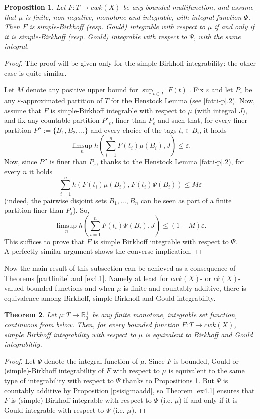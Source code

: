\documentclass[11pt,a4paper,twoside]{amsart}
\newtheorem{theorem}{Theorem}[section]
\newtheorem{proposition}[theorem]{Proposition}
\begin{document}
\begin{proposition}\label{mupsiwb}
Let $F:T\to cwk(X)$ be any bounded multifunction, and assume
 that $\mu$ is finite, non-negative, monotone and integrable, with integral function $\Psi$. Then $F$ is simple-Birkhoff (resp. Gould) integrable with respect to $\mu$ if and only if it is simple-Birkhoff (resp. Gould) integrable  with respect to $\Psi$, with the same integral.
\end{proposition}
\begin{proof}
The proof will be given only for the simple Birkhoff integrability: the other case is quite similar.

Let $M$ denote any positive upper bound for $\sup_{t\in T}|F(t)|$. Fix ${\varepsilon}$ and let $P_{\varepsilon}$ be any ${\varepsilon}$-approximated partition of $T$ for the Henstock Lemma (see \ref{fatti-p}.2). Now, assume that $F$ is simple-Birkhoff integrable with respect to $\mu$ (with integral $J$), and fix any countable partition $P'_{\varepsilon}$, finer than $P_{\varepsilon}$ and such that, for every finer partition $P'':=\{B_1,B_2,...\}$ and every choice of the tags $t_i\in B_i$, it holds
$$\limsup_nh(\sum_{i=1}^nF(t_i)\mu(B_i),J)\leq {\varepsilon}.$$ 
Now, since $P''$ is finer than $P_{\varepsilon}$, thanks to the Henstock Lemma \ref{fatti-p}.2), for every $n$ it holds
$$\sum_{i=1}^nh(F(t_i)\mu(B_i),F(t_i)\Psi(B_i))\leq M {\varepsilon}$$
(indeed, the pairwise disjoint sets $B_1,...,B_n$ can be seen as part of a finite partition finer than $P_{\varepsilon}$).
So, 
$$\limsup_nh(\sum_{i=1}^n F(t_i)\Psi(B_i),J)\leq (1+M){\varepsilon}.$$
This suffices to prove that $F$ is simple Birkhoff integrable with respect to $\Psi$.
\\
A perfectly similar argument shows the converse implication.
\end{proof}

Now the main result of this subsection can be achieved as a 
 consequence of Theorems \ref{partfinite} and \ref{ex4.1}. Namely
at least for $cwk(X)$- or $ck(X)$-valued bounded functions and when $\mu$ is finite and countably additive, there is equivalence among Birkhoff, simple Birkhoff and Gould integrability.\\

\begin{theorem}\label{general}
Let $\mu:T\to {\mathbb{R}}^+_0$ be any finite monotone, integrable set function, continuous from below. Then, for every bounded function $F:T\to cwk(X)$, simple Birkhoff integrability with respect to $\mu$ is equivalent to Birkhoff and Gould integrability.
\end{theorem}
\begin{proof}
Let $\Psi$ denote the integral function of $\mu$. Since $F$ is bounded, Gould or (simple)-Birkhoff integrability of $F$ with respect to $\mu$ is equivalent to the same type of integrability with respect to $\Psi$ thanks to Propositions \ref{mupsiwb}. But $\Psi$ is countably additive by Proposition \ref{psisigmaadd}, so Theorem \ref{ex4.1} ensures that $F$ is (simple)-Birkhoff integrable with respect to $\Psi$ (i.e. $\mu$) if and only if it is Gould integrable with respect to $\Psi$ (i.e. $\mu$).
\end{proof}
 
\end{document}
